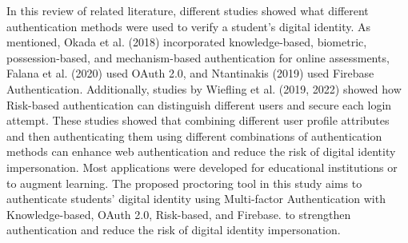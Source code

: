 \documentclass{icsthesis}
\begin{document}
\begin{mainmatter}
\indent In this review of related literature, different studies showed what different authentication methods were used to verify a student's digital identity. As mentioned, Okada et al. (2018) incorporated knowledge-based, biometric, possession-based, and mechanism-based authentication for online assessments, Falana et al. (2020) used OAuth 2.0, and Ntantinakis (2019) used Firebase Authentication. Additionally, studies by Wiefling et al. (2019, 2022) showed how Risk-based authentication can distinguish different users and secure each login attempt. These studies showed that combining different user profile attributes and then authenticating them using different combinations of authentication methods can enhance web authentication and reduce the risk of digital identity impersonation. Most applications were developed for educational institutions or to augment learning. The proposed proctoring tool in this study aims to authenticate students' digital identity using Multi-factor Authentication with Knowledge-based, OAuth 2.0, Risk-based, and Firebase. to strengthen authentication and reduce the risk of digital identity impersonation.

\end{mainmatter}
\end{document}
